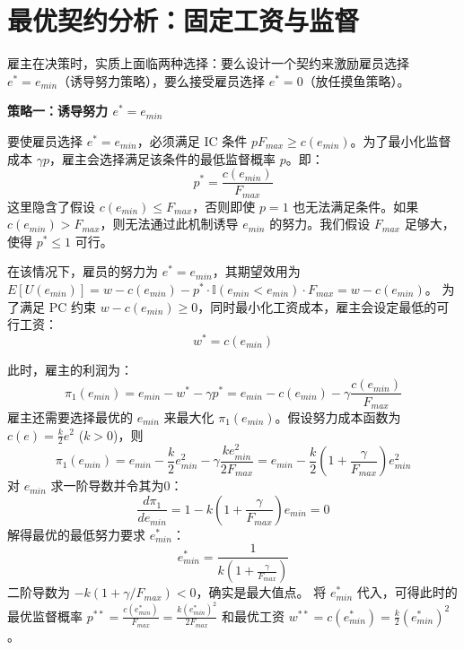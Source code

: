\section{最优契约分析：固定工资与监督}
\label{sec:optimal_contract_monitor}

雇主在决策时，实质上面临两种选择：要么设计一个契约来激励雇员选择 $e^*=e_{min}$（诱导努力策略），要么接受雇员选择 $e^*=0$（放任摸鱼策略）。

\textbf{策略一：诱导努力 $e^* = e_{min}$}

要使雇员选择 $e^* = e_{min}$，必须满足 IC 条件 $p F_{max} \ge c(e_{min})$。为了最小化监督成本 $\gamma p$，雇主会选择满足该条件的最低监督概率 $p$。即：
\begin{equation} \label{eq:optimal_p}
p^* = \frac{c(e_{min})}{F_{max}}
\end{equation}
这里隐含了假设 $c(e_{min}) \le F_{max}$，否则即使 $p=1$ 也无法满足条件。如果 $c(e_{min}) > F_{max}$，则无法通过此机制诱导 $e_{min}$ 的努力。我们假设 $F_{max}$ 足够大，使得 $p^* \le 1$ 可行。

在该情况下，雇员的努力为 $e^*=e_{min}$，其期望效用为 $E[U(e_{min})] = w - c(e_{min}) - p^* \cdot \mathbb{I}(e_{min} < e_{min}) \cdot F_{max} = w - c(e_{min})$。
为了满足 PC 约束 $w - c(e_{min}) \ge 0$，同时最小化工资成本，雇主会设定最低的可行工资：
\begin{equation} \label{eq:optimal_w_emin}
w^* = c(e_{min})
\end{equation}

此时，雇主的利润为：
\begin{equation} \label{eq:profit_emin}
\pi_1(e_{min}) = e_{min} - w^* - \gamma p^* = e_{min} - c(e_{min}) - \gamma \frac{c(e_{min})}{F_{max}}
\end{equation}
雇主还需要选择最优的 $e_{min}$ 来最大化 $\pi_1(e_{min})$。假设努力成本函数为 $c(e) = \frac{k}{2}e^2$ ($k>0$)，则
\begin{equation}
\pi_1(e_{min}) = e_{min} - \frac{k}{2}e_{min}^2 - \gamma \frac{k e_{min}^2}{2 F_{max}} = e_{min} - \frac{k}{2} \left( 1 + \frac{\gamma}{F_{max}} \right) e_{min}^2
\end{equation}
对 $e_{min}$ 求一阶导数并令其为0：
\begin{equation}
\frac{d\pi_1}{de_{min}} = 1 - k \left( 1 + \frac{\gamma}{F_{max}} \right) e_{min} = 0
\end{equation}
解得最优的最低努力要求 $e_{min}^*$：
\begin{equation} \label{eq:optimal_emin}
e_{min}^* = \frac{1}{k \left( 1 + \frac{\gamma}{F_{max}} \right)}
\end{equation}
二阶导数为 $-k(1 + \gamma/F_{max}) < 0$，确实是最大值点。
将 $e_{min}^*$ 代入，可得此时的最优监督概率 $p^{**} = \frac{c(e_{min}^*)}{F_{max}} = \frac{k (e_{min}^*)^2}{2 F_{max}}$ 和最优工资 $w^{**} = c(e_{min}^*) = \frac{k}{2}(e_{min}^*)^2$。

